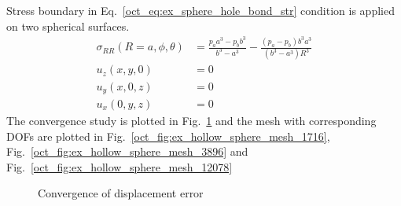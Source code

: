 Stress boundary in Eq.~\ref{oct_eq:ex_sphere_hole_bond_str} condition is applied on two spherical surfaces.
\begin{subequations}
    \begin{align}
    \sigma_{RR}(R=a,\phi,\theta) & = \frac{p_aa^3-p_bb^3}{b^3-a^3} - \frac{(p_a-p_b)b^3a^3}{(b^3-a^3)R^3}\\
    u_z(x,y,0) &= 0\\
    u_y(x,0,z) & = 0 \\
    u_x(0,y,z) & = 0
  \end{align}
\label{oct_eq:ex_sphere_hole_bond_str}
\end{subequations}
%
The convergence study is plotted in Fig.~\ref{oct_fig:ex_hollow_sphere_conv} and the mesh with corresponding DOFs are plotted in Fig.~\ref{oct_fig:ex_hollow_sphere_mesh_1716}, Fig.~\ref{oct_fig:ex_hollow_sphere_mesh_3896} and Fig.~\ref{oct_fig:ex_hollow_sphere_mesh_12078}
\begin{figure}[h!]
    \centering
    \caption{Convergence of displacement error}
    \label{oct_fig:ex_hollow_sphere_conv}
\end{figure}